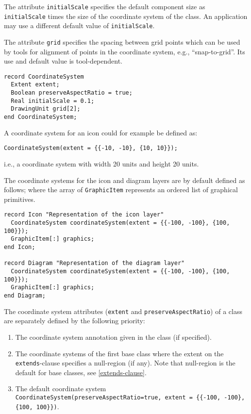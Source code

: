 The attribute \lstinline!initialScale! specifies the default component size as \lstinline!initialScale! times the size of the coordinate system of the class.
An application may use a different default value of \lstinline!initialScale!.

The attribute \lstinline!grid! specifies the spacing between grid points which can be used by tools for alignment of points in the coordinate system, e.g., ``snap-to-grid''.
Its use and default value is tool-dependent.

\begin{lstlisting}[language=modelica]
record CoordinateSystem
  Extent extent;
  Boolean preserveAspectRatio = true;
  Real initialScale = 0.1;
  DrawingUnit grid[2];
end CoordinateSystem;
\end{lstlisting}

\begin{example}
A coordinate system for an icon could for example be defined as:
\begin{lstlisting}[language=modelica]
CoordinateSystem(extent = {{-10, -10}, {10, 10}});
\end{lstlisting}
i.e., a coordinate system with width 20 units and height 20 units.
\end{example}

The coordinate systems for the icon and diagram layers are by default defined as follows; where the array of \lstinline!GraphicItem! represents an ordered list of graphical primitives.

\begin{lstlisting}[language=modelica]
record Icon "Representation of the icon layer"
  CoordinateSystem coordinateSystem(extent = {{-100, -100}, {100, 100}});
  GraphicItem[:] graphics;
end Icon;

record Diagram "Representation of the diagram layer"
  CoordinateSystem coordinateSystem(extent = {{-100, -100}, {100, 100}});
  GraphicItem[:] graphics;
end Diagram;
\end{lstlisting}
The coordinate system attributes (\lstinline!extent! and \lstinline!preserveAspectRatio!) of a class are separately defined by the following priority:
\begin{enumerate}
\item
  The coordinate system annotation given in the class (if specified).
\item
  The coordinate systems of the first base class where the extent on the \lstinline!extends!-clause specifies a null-region (if any).
  Note that null-region is the default for base classes, see \cref{extends-clause}.
\item
  The default coordinate system \lstinline!CoordinateSystem(preserveAspectRatio=true, extent = {{-100, -100}, {100, 100}})!.
\end{enumerate}

